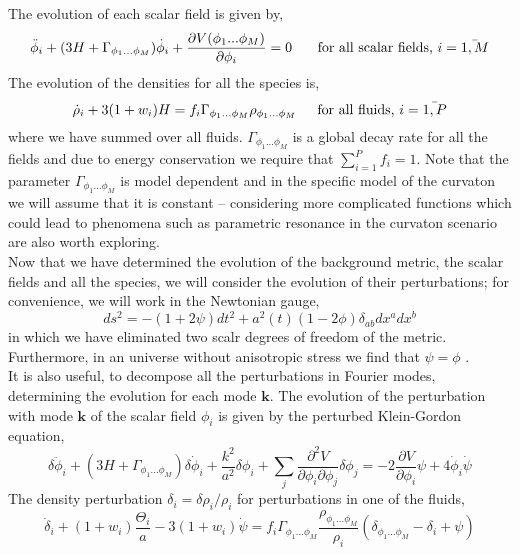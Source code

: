 \documentclass[11pt]{article}
\begin{document}
\indent The evolution of each scalar field is given by, 
\begin{equation}
\ddot \phi_i + (3H + \Gamma_{\phi_1 ... \phi_M})\dot \phi_i + \frac{\partial V(\phi_1 ... \phi_M)}{\partial \phi_i} = 0 \mbox{ \indent for all scalar fields, } i = \bar{1,M}
\end{equation}
The evolution of the densities for all the species is, 
\begin{equation}
\dot \rho_i + 3(1 + w_i) H = f_i \Gamma_{\phi_1 ... \phi_M}  \rho_{\phi_1 ... \phi_M} \mbox{\indent for all fluids,\ } i = \bar{1,P}
\end{equation}
 where we have summed over all fluids. $\Gamma_{\phi_1 ... \phi_M} $ is a global decay rate for all the fields and due to energy conservation we require that $\sum_{i=1}^P f_i = 1$. Note that the parameter $\Gamma_{\phi_1 ... \phi_M} $  is model dependent and in the specific model of the curvaton we will assume that it is constant -- considering more complicated functions which could lead to phenomena such as parametric resonance in the curvaton scenario are also worth exploring.\\
\indent Now that we have determined the evolution of the background metric, the scalar fields and all the species, we will consider the evolution of their perturbations; for convenience, we will work in the Newtonian gauge, 
\begin{equation}
ds^2 = -(1 + 2\psi)dt^2 + a^2(t)(1 - 2\phi) \delta_{ab} dx^a dx^b
\end{equation}
in which we have eliminated two scalr degrees of freedom of the metric. Furthermore, in an universe without anisotropic stress we find that $\psi = \phi$ .\\
\indent It is also useful, to decompose all the perturbations in Fourier modes, determining the evolution for each mode $\mathbf k$.  The evolution of the perturbation with mode $\mathbf k$ of the scalar field $\phi_i$ is given by the perturbed Klein-Gordon equation, 
\begin{equation}
\delta \ddot \phi_i + (3H + \Gamma_{\phi_1 ... \phi_M})\delta \dot \phi_i  + \frac{k^2}{a^2} \delta \phi_i + \sum_j \frac{\partial ^2 V}{\partial \phi_i \partial \phi_j} \delta \phi_j = -2 \frac{\partial V}{\partial \phi_i} \psi + 4 \dot \phi_i \dot \psi 
\end{equation} 
The density perturbation $\delta_i = \delta\rho_i/\rho_i$ for perturbations in one of the fluids,  
\begin{equation}
\dot \delta_i + (1 + w_i) \frac{\Theta_i}a - 3(1+ w_i) \dot \psi = f_i  \Gamma_{\phi_1 ... \phi_M} \frac{\rho_{\phi_1 ... \phi_M}}{\rho_i}(\delta_{\phi_1 ... \phi_M} - \delta_i + \psi)
\end{equation} 
\end{document}
